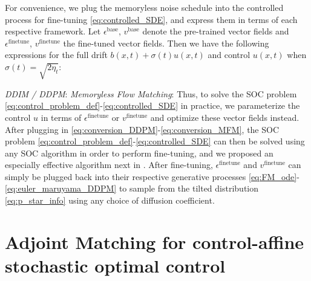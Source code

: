 \documentclass[]{fairmeta}
\begin{document}
For convenience, we plug the memoryless noise schedule into the controlled process for fine-tuning \eqref{eq:controlled_SDE}, and express them in terms of each respective framework.
Let $\epsilon^{\mathrm{base}}$, $v^{\mathrm{base}}$ denote the pre-trained vector fields and $\epsilon^{\mathrm{finetune}}$, $v^{\mathrm{finetune}}$ the fine-tuned vector fields. Then we have the following expressions for the full drift $b(x,t) + \sigma(t) u(x,t)$ and control $u(x,t)$ when $\sigma(t) = \sqrt{2\eta_t}$:

\quad \textit{DDIM / DDPM}:
\vspace{0.4em}
\quad \textit{Memoryless Flow Matching}:
Thus, to solve the SOC problem \eqref{eq:control_problem_def}-\eqref{eq:controlled_SDE} in practice, we parameterize the control $u$ in terms of $\epsilon^{\mathrm{finetune}}$ or $v^{\mathrm{finetune}}$ and optimize these vector fields instead. After plugging in \eqref{eq:conversion_DDPM}-\eqref{eq:conversion_MFM}, the SOC problem \eqref{eq:control_problem_def}-\eqref{eq:controlled_SDE} can then be solved using any SOC algorithm in order to perform fine-tuning, and we proposed an especially effective algorithm next in . After fine-tuning, $\epsilon^{\mathrm{finetune}}$ and $v^{\mathrm{finetune}}$ can simply be plugged back into their respective generative processes \eqref{eq:FM_ode}-\eqref{eq:euler_maruyama_DDPM} to sample from the tilted distribution \eqref{eq:p_star_info} using any choice of diffusion coefficient. 

\section{Adjoint Matching for control-affine stochastic optimal control} \label{sec:adjoint_matching}
\end{document}
